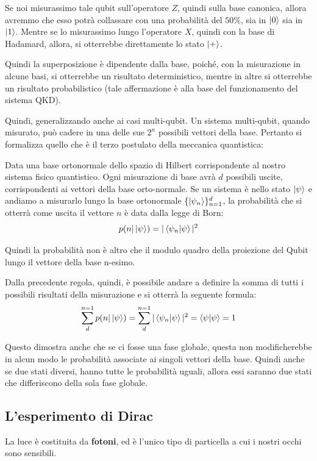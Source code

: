 Se noi misurassimo tale qubit sull'operatore \(Z\), quindi sulla base canonica, allora avremmo che esso potrà collassare con una probabilità del \(50 \%\), sia in \(\ket{0}\) sia in \(\ket{1}\). Mentre se lo misurassimo lungo l'operatore \(X\), quindi con la base di Hadamard, allora,  si otterrebbe direttamente lo stato \(\ket{+}\).

Quindi la superposizione è dipendente dalla base, poiché, con la misurazione in alcune basi, si otterrebbe un risultato deterministico, mentre in altre si otterrebbe un risultato probabilistico (tale affermazione è alla base del funzionamento del sistema QKD).

Quindi, generalizzando anche ai casi multi-qubit. Un sistema multi-qubit, quando misurato, può cadere in una delle sue \(2^n\) possibili vettori della base. Pertanto si formalizza quello che è il terzo postulato della meccanica quantistica:

Data una base ortonormale dello spazio di Hilbert corrispondente al nostro sistema fisico quantistico. Ogni misurazione di base avrà \(d\) possibili uscite, corrispondenti ai vettori della base orto-normale. Se un sistema è nello stato \(\ket{\psi}\) e andiamo a misurarlo lungo la base ortonormale \(\{\ket{\psi_n}\}^d_{n=1}\), la probabilità che si otterrà come uscita il vettore \(n\) è data dalla legge di Born:
\[
p(n|\ket{\psi}) = |\braket{\psi_n | \psi}|^2
\]

Quindi la probabilità non è altro che il modulo quadro della proiezione del Qubit lungo il vettore della base n-esimo. 

Dalla precedente regola, quindi, è possibile andare a definire la somma di tutti i possibili risultati della misurazione e si otterrà la seguente formula:
\[
\sum_{d}^{n=1}p(n | \ket{\psi}) = \sum_{d}^{n=1}|\braket{\psi_n | \psi}|^2 = \braket{\psi | \psi} = 1
\]

Questo dimostra anche che se ci fosse una fase globale, questa non modificherebbe in alcun modo le probabilità associate ai singoli vettori della base. Quindi anche se due stati diversi, hanno tutte le probabilità uguali, allora essi saranno due stati che differiscono della sola fase globale.

\subsection{L'esperimento di Dirac}
La luce è costituita da \textbf{fotoni}, ed è l'unico tipo di particella a cui i nostri occhi sono sensibili.

